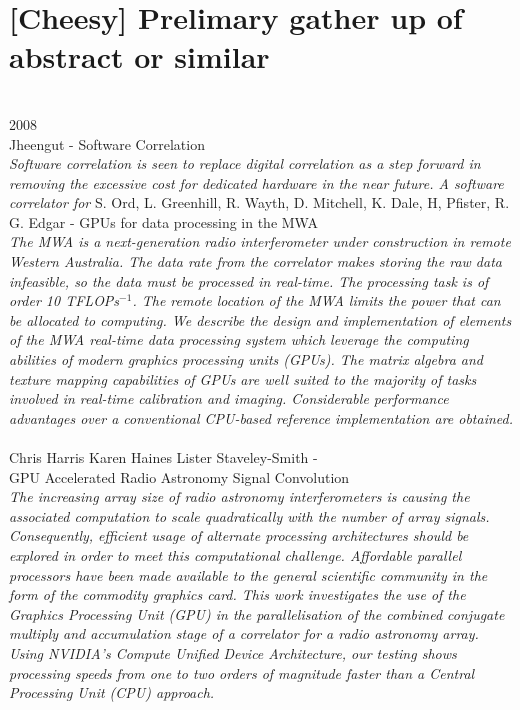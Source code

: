 \section{[Cheesy] Prelimary gather up of abstract or similar}
\hfill\\
{\large 2008}\\ \nocite{jheengut2008MRTsoftcrr}
{\large Jheengut - Software Correlation}\\
\indent
\textit{Software correlation is seen to replace digital correlation as a step forward in removing the excessive cost for dedicated hardware in the near future. A software correlator for}
\noindent
{\large S. Ord, L. Greenhill, R. Wayth, D. Mitchell, K. Dale, H, Pfister, R. G. Edgar - GPUs  for data processing in the MWA}\\
\indent
\textit{The MWA is a next-generation radio interferometer under construction
in remote Western Australia. The data rate from the correlator makes
storing the raw data infeasible, so the data must be processed in real-time. The
processing task is of order 10 TFLOPs$^{-1}$. The remote location of the MWA
limits the power that can be allocated to computing. We describe the design and
implementation of elements of the MWA real-time data processing system which
leverage the computing abilities of modern graphics processing units (GPUs).
The matrix algebra and texture mapping capabilities of GPUs are well suited to
the majority of tasks involved in real-time calibration and imaging. Considerable
performance advantages over a conventional CPU-based reference implementation
are obtained.}
\hfill\\\\
{\large Chris Harris Karen Haines Lister Staveley-Smith - \hfill \\ GPU Accelerated Radio Astronomy Signal Convolution }\\
\indent
\textit{
The increasing array size of radio astronomy interferometers is causing the associated computation to scale quadratically with the number of array signals. Consequently, efficient usage of alternate processing architectures should be explored in order to meet this computational challenge. Affordable parallel processors have been made available to the general scientific community in the form of the commodity graphics card. This work investigates the use of the Graphics Processing Unit (GPU) in the parallelisation of the combined conjugate multiply and accumulation stage of a correlator for a radio astronomy array. Using NVIDIA’s Compute Unified Device Architecture, our testing shows processing speeds from one to two orders of magnitude faster than a Central Processing
Unit (CPU) approach.
}


